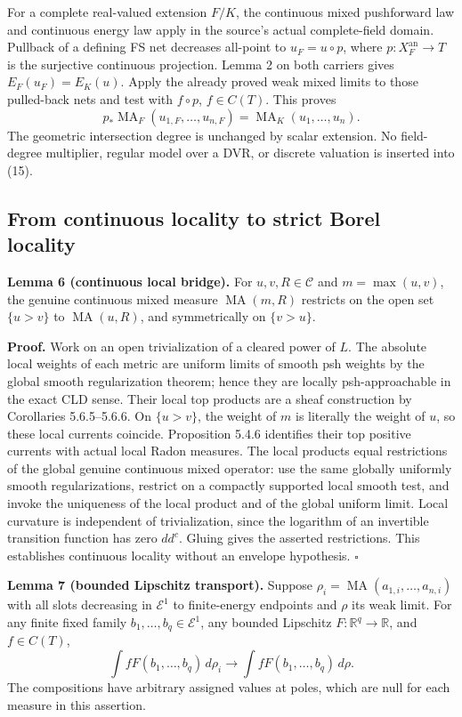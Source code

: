 \documentclass[
]{article}
\begin{document}
For a complete real-valued extension \(F/K\), the continuous mixed
pushforward law and continuous energy law apply in the source's actual
complete-field domain. Pullback of a defining FS net decreases all-point
to \(u_F=u\circ p\), where \(p:X_F^{\mathrm{an}}\to T\) is the
surjective continuous projection. Lemma 2 on both carriers gives
\(E_F(u_F)=E_K(u)\). Apply the already proved weak mixed limits to those
pulled-back nets and test with \(f\circ p\), \(f\in C(T)\). This proves
\[
p_*\operatorname{MA}_F(u_{1,F},\ldots,u_{n,F})=\operatorname{MA}_K(u_1,\ldots,u_n).
\tag{15}
\] The geometric intersection degree is unchanged by scalar extension.
No field-degree multiplier, regular model over a DVR, or discrete
valuation is inserted into (15).

\subsection{From continuous locality to strict Borel
locality}\label{from-continuous-locality-to-strict-borel-locality}

\textbf{Lemma 6 (continuous local bridge).} For \(u,v,R\in\mathcal C\)
and \(m=\max(u,v)\), the genuine continuous mixed measure
\(\operatorname{MA}(m,R)\) restricts on the open set \(\{u>v\}\) to
\(\operatorname{MA}(u,R)\), and symmetrically on \(\{v>u\}\).

\textbf{Proof.} Work on an open trivialization of a cleared power of
\(L\). The absolute local weights of each metric are uniform limits of
smooth psh weights by the global smooth regularization theorem; hence
they are locally psh-approachable in the exact CLD sense. Their local
top products are a sheaf construction by Corollaries 5.6.5--5.6.6. On
\(\{u>v\}\), the weight of \(m\) is literally the weight of \(u\), so
these local currents coincide. Proposition 5.4.6 identifies their top
positive currents with actual local Radon measures. The local products
equal restrictions of the global genuine continuous mixed operator: use
the same globally uniformly smooth regularizations, restrict on a
compactly supported local smooth test, and invoke the uniqueness of the
local product and of the global uniform limit. Local curvature is
independent of trivialization, since the logarithm of an invertible
transition function has zero \(dd^c\). Gluing gives the asserted
restrictions. This establishes continuous locality without an envelope
hypothesis. \(\square\)

\textbf{Lemma 7 (bounded Lipschitz transport).} Suppose
\(\rho_i=\operatorname{MA}(a_{1,i},\ldots,a_{n,i})\) with all slots
decreasing in \(\mathcal E^1\) to finite-energy endpoints and \(\rho\)
its weak limit. For any finite fixed family
\(b_1,\ldots,b_q\in\mathcal E^1\), any bounded Lipschitz
\(F:\mathbb R^q\to\mathbb R\), and \(f\in C(T)\), \[
\int fF(b_1,\ldots,b_q)\,d\rho_i\longrightarrow\int fF(b_1,\ldots,b_q)\,d\rho.
\tag{16}
\] The compositions have arbitrary assigned values at poles, which are
null for each measure in this assertion.
\end{document}
